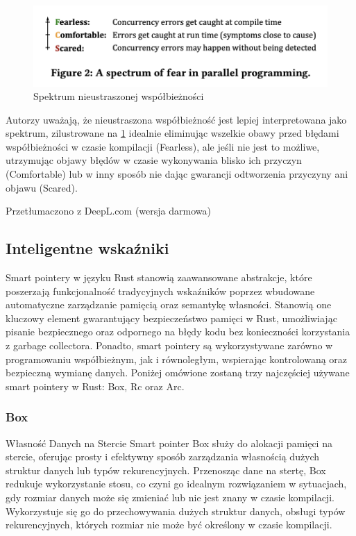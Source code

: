 \begin{figure}[H]
    \centering
    \includegraphics[width=0.5\linewidth]{images/FearlesRustExplain.png}
    \caption{Spektrum nieustraszonej współbieżności \cite{WhenIsParallelismFearlessandZeroCostwithRust?}}
    \label{fig:FearlessSpectrum}
\end{figure}
Autorzy \cite{WhenIsParallelismFearlessandZeroCostwithRust?}
uważają, że nieustraszona współbieżność jest lepiej interpretowana jako spektrum, zilustrowane na \ref{fig:FearlessSpectrum} idealnie eliminując wszelkie obawy przed błędami współbieżności w czasie kompilacji (Fearless), ale jeśli nie jest to możliwe, utrzymując objawy błędów w czasie wykonywania blisko ich przyczyn (Comfortable) lub w inny sposób nie dając gwarancji odtworzenia przyczyny ani objawu (Scared).

Przetłumaczono z DeepL.com (wersja darmowa)

\subsection{Inteligentne wskaźniki }
Smart pointery w języku Rust stanowią zaawansowane abstrakcje, które poszerzają funkcjonalność tradycyjnych wskaźników poprzez wbudowane automatyczne zarządzanie pamięcią oraz semantykę własności. Stanowią one kluczowy element gwarantujący bezpieczeństwo pamięci w Rust, umożliwiając pisanie bezpiecznego oraz odpornego na błędy kodu bez konieczności korzystania z garbage collectora. Ponadto, smart pointery są wykorzystywane zarówno w programowaniu współbieżnym, jak i równoległym, wspierając kontrolowaną oraz bezpieczną wymianę danych. Poniżej omówione zostaną trzy najczęściej używane smart pointery w Rust: Box, Rc oraz Arc.

\subsubsection{Box}
\label{BOX}
Własność Danych na Stercie
Smart pointer Box służy do alokacji pamięci na stercie, oferując prosty i efektywny sposób zarządzania własnością dużych struktur danych lub typów rekurencyjnych. Przenosząc dane na stertę, Box redukuje wykorzystanie stosu, co czyni go idealnym rozwiązaniem w sytuacjach, gdy rozmiar danych może się zmieniać lub nie jest znany w czasie kompilacji.\\
Wykorzystuje się go do przechowywania dużych struktur danych, obsługi typów rekurencyjnych, których rozmiar nie może być określony w czasie kompilacji.

